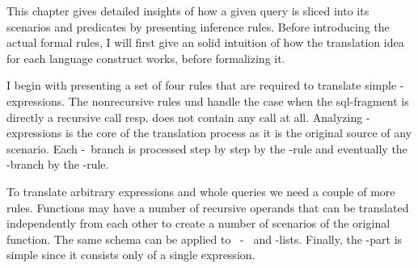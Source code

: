

This chapter gives detailed insights of how a given query is sliced into its scenarios and predicates by presenting inference rules. Before introducing the actual formal rules, I will first give an solid intuition of how the translation idea for each language construct works, before formalizing it.

I begin with presenting a set of four rules that are required to translate simple \CASE-expressions. The nonrecursive rules \RREC und \RBASE handle the case when the sql-fragment is directly a recursive call resp. does not contain any call at all. Analyzing \CASE-expressions is the core of the translation process as it is the original source of any scenario. Each \WHEN-\THEN~branch is processed step by step by the \RWHEN-rule and eventually the \ELSE-branch by the \RELSE-rule.

To translate arbitrary expressions and whole queries we need a couple of more rules. Functions may have a number of recursive operands that can be translated independently from each other to create a number of scenarios of the original function. The same schema can be applied to ~\SELECT-~ and \FROM-lists. Finally, the \WHERE-part is simple since it consists only of a single expression.

